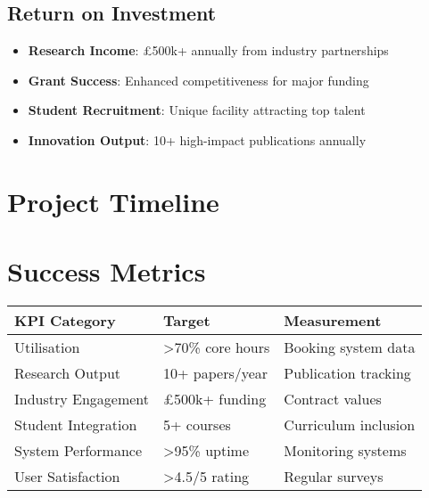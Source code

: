\subsection*{Return on Investment}
\begin{itemize}
    \item \textbf{Research Income}: £500k+ annually from industry partnerships
    \item \textbf{Grant Success}: Enhanced competitiveness for major funding
    \item \textbf{Student Recruitment}: Unique facility attracting top talent
    \item \textbf{Innovation Output}: 10+ high-impact publications annually
\end{itemize}

\section*{Project Timeline}

\begin{figure}[H]
\centering
{}
\end{figure}

\section*{Success Metrics}

\begin{table}[H]
\centering
\begin{tabular}{@{}lll@{}}
\toprule
\textbf{KPI Category} & \textbf{Target} & \textbf{Measurement} \\
\midrule
Utilisation & >70\% core hours & Booking system data \\
Research Output & 10+ papers/year & Publication tracking \\
Industry Engagement & £500k+ funding & Contract values \\
Student Integration & 5+ courses & Curriculum inclusion \\
System Performance & >95\% uptime & Monitoring systems \\
User Satisfaction & >4.5/5 rating & Regular surveys \\
\bottomrule
\end{tabular}
\end{table}

